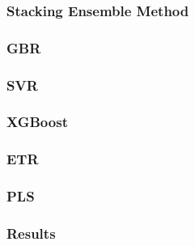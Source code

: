 \subsubsection{Stacking Ensemble Method}

\subsubsection{GBR} %

\subsubsection{SVR}

\subsubsection{XGBoost}

\subsubsection{ETR}

\subsubsection{PLS}

\subsubsection{Results}
